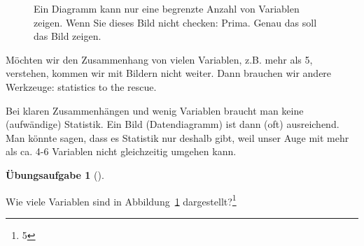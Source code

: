 \documentclass[
  a4paper,
  DIV=11]{scrreprt}
\theoremstyle{definition}
\newtheorem{exercise}{Übungsaufgabe}[chapter]
\theoremstyle{definition}
\theoremstyle{definition}
\theoremstyle{remark}
\begin{document}
\begin{figure}


\caption{\label{fig-many-dims}Ein Diagramm kann nur eine begrenzte
Anzahl von Variablen zeigen. Wenn Sie dieses Bild nicht checken: Prima.
Genau das soll das Bild zeigen.}

\end{figure}%

Möchten wir den Zusammenhang von vielen Variablen, z.B. mehr als 5,
verstehen, kommen wir mit Bildern nicht weiter. Dann brauchen wir andere
Werkzeuge: statistics to the rescue.

\begin{tcolorbox}[enhanced jigsaw, leftrule=.75mm, opacitybacktitle=0.6, colback=white, colframe=quarto-callout-note-color-frame, coltitle=black, colbacktitle=quarto-callout-note-color!10!white, opacityback=0, left=2mm, breakable, titlerule=0mm, toptitle=1mm, bottomtitle=1mm, rightrule=.15mm, title=\textcolor{quarto-callout-note-color}{\faInfo}\hspace{0.5em}{Hinweis}, arc=.35mm, bottomrule=.15mm, toprule=.15mm]

Bei klaren Zusammenhängen und wenig Variablen braucht man keine
(aufwändige) Statistik. Ein Bild (Datendiagramm) ist dann (oft)
ausreichend. Man könnte sagen, dass es Statistik nur deshalb gibt, weil
unser Auge mit mehr als ca. 4-6 Variablen nicht gleichzeitig umgehen
kann.

\end{tcolorbox}

\begin{exercise}[]\protect\hypertarget{exr-anz-dims}{}\label{exr-anz-dims}

Wie viele Variablen sind in Abbildung~\ref{fig-many-dims}
dargestellt?\footnote{5}

\end{exercise}
\end{document}
